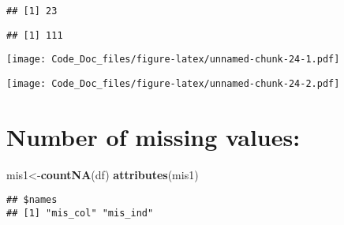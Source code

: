 \documentclass[]{article}
\newenvironment{Shaded}{\begin{snugshade}}{\end{snugshade}}
\newcommand{\KeywordTok}[1]{\textcolor[rgb]{0.13,0.29,0.53}{\textbf{{#1}}}}
\newcommand{\DataTypeTok}[1]{\textcolor[rgb]{0.13,0.29,0.53}{{#1}}}
\newcommand{\DecValTok}[1]{\textcolor[rgb]{0.00,0.00,0.81}{{#1}}}
\newcommand{\StringTok}[1]{\textcolor[rgb]{0.31,0.60,0.02}{{#1}}}
\newcommand{\CommentTok}[1]{\textcolor[rgb]{0.56,0.35,0.01}{\textit{{#1}}}}
\newcommand{\OtherTok}[1]{\textcolor[rgb]{0.56,0.35,0.01}{{#1}}}
\newcommand{\NormalTok}[1]{{#1}}
\begin{document}
\begin{verbatim}
## [1] 23
\end{verbatim}

\begin{Shaded}
\end{Shaded}

\begin{verbatim}
## [1] 111
\end{verbatim}

\begin{Shaded}
\end{Shaded}

\texttt{[image: Code\_Doc\_files/figure-latex/unnamed-chunk-24-1.pdf]}

\begin{Shaded}
\end{Shaded}

\texttt{[image: Code\_Doc\_files/figure-latex/unnamed-chunk-24-2.pdf]}

\section{Number of missing values:}\label{number-of-missing-values}

\begin{Shaded}
\begin{Highlighting}[]
\NormalTok{mis1<-}\KeywordTok{countNA}\NormalTok{(df)}
\KeywordTok{attributes}\NormalTok{(mis1)}
\end{Highlighting}
\end{Shaded}

\begin{verbatim}
## $names
## [1] "mis_col" "mis_ind"
\end{verbatim}
\end{document}
